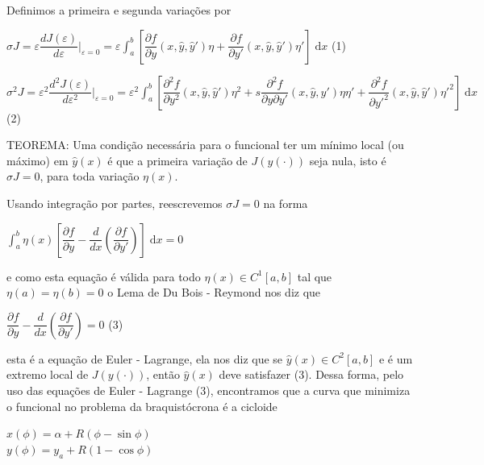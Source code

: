 \documentclass[12pt, a4paper]{article}
\begin{document}
Definimos a primeira e segunda variações por

\begin{center}

$\sigma J = \varepsilon \dfrac{dJ(\varepsilon)}{d\varepsilon}|_{\varepsilon=0}= \varepsilon \int_a^b [\dfrac{\partial f}{\partial y}(x, \hat{y}, \hat{y}')\eta + \dfrac{\partial f}{\partial y'}(x, \hat{y}, \hat{y}')\eta'] \; \mathrm{d}x $ (1)

$\sigma^2 J = \varepsilon^2 \dfrac{d^2 J(\varepsilon)}{d\varepsilon^2}|_{\varepsilon=0}= \varepsilon^2 \int_a^b [\dfrac{\partial^2 f}{\partial y^2}(x, \hat{y}, \hat{y}')\eta^2  + s \dfrac{\partial^2 f}{\partial y \partial y'}(x, \hat{y}, \hat{y}')\eta\eta'+ \dfrac{\partial^2 f}{\partial y'^2}(x, \hat{y}, \hat{y}')\eta'^2 ] \; \mathrm{d}x $ (2)

\end{center}

TEOREMA: Uma condição necessária para o funcional ter um mínimo local (ou máximo) em $\hat{y}(x)$ é que a primeira variação de $J(y(\cdot))$ seja nula, isto é $\sigma J=0$, para toda variação $\eta(x)$.

Usando integração por partes, reescrevemos $\sigma J=0$ na forma

\begin{center}
$\int_a^b \eta(x) [\dfrac{\partial f}{\partial y} - \dfrac{d}{dx}(\dfrac{\partial f}{\partial y'})] \; \mathrm{d}x = 0$
\end{center}

e como esta equação é válida para todo $\eta(x) \in C^1[a,b]$ tal que $\eta(a)=\eta(b)=0$ o Lema de Du Bois - Reymond nos diz que 

\begin{center}
$\dfrac{\partial f}{\partial y} - \dfrac{d}{dx}(\dfrac{\partial f}{\partial y'}) = 0 $ (3)
\end{center}

esta é a equação de Euler - Lagrange, ela nos diz que se $\hat{y}(x) \in C^2 [a,b]$ e é um extremo local de $J(y(\cdot))$, então $\hat{y}(x)$ deve satisfazer (3). Dessa forma, pelo uso das equações de Euler - Lagrange (3), encontramos que a curva que minimiza o funcional no problema da braquistócrona é a cicloide

\begin{center}
$x(\phi)= \alpha + R(\phi - \sin \phi) $\\
$y(\phi)= y_a  + R(1 - \cos \phi)$

\end{center}
\end{document}
